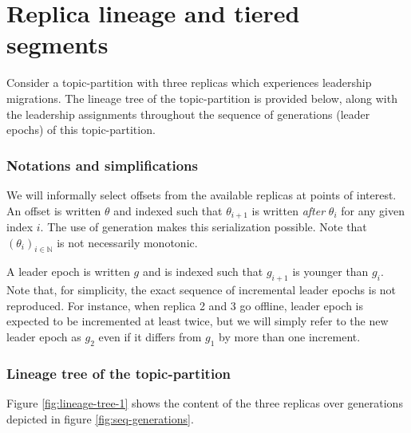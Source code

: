 \documentclass{article}
\begin{document}
\section{Replica lineage and tiered segments}

Consider a topic-partition with three replicas which experiences leadership migrations. The lineage tree of the topic-partition is provided below, along with the leadership assignments throughout the sequence of generations (leader epochs) of this topic-partition.

\subsubsection{Notations and simplifications}

We will informally select offsets from the available replicas at points of interest. An offset is written $\theta$ and indexed such that $\theta_{i+1}$ is written \textit{after} $\theta_i$ for any given index $i$. The use of generation makes this serialization possible. Note that $(\theta_i)_{i \in \mathbb{N}}$ is not necessarily monotonic.

A leader epoch is written $g$ and is indexed such that $g_{i+1}$ is younger than $g_i$. Note that, for simplicity, the exact sequence of incremental leader epochs is not reproduced. For instance, when replica 2 and 3 go offline, leader epoch is expected to be incremented at least twice, but we will simply refer to the new leader epoch as $g_2$ even if it differs from $g_1$ by more than one increment.

\subsubsection{Lineage tree of the topic-partition}

Figure \ref{fig:lineage-tree-1} shows the content of the three replicas over generations depicted in figure \ref{fig:seq-generations}.
\end{document}
